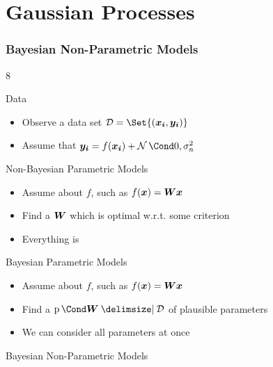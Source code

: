 \section{Gaussian Processes}
\begin{frame}[label=gp_non_parametric_models]
    \frametitle{Bayesian Non-Parametric Models}

    \begin{overlayarea}{\textwidth}{8\baselineskip}
         {
            \begin{block}{Data}
                \begin{itemize}
                    \item Observe a  data set $\D = \Set{\left( \mat{x_i}, \mat{y_i} \right)}$
                    \item Assume that $\mat{y_i} = f(\mat{x_i}) + \Gaussian{0, \sigma_n^2}$
                \end{itemize}
            \end{block}
        }
         {
            \begin{block}{Non-Bayesian Parametric Models}
                \begin{itemize}
                    \item Assume  about $f$, such as $f(\bm{x}) = \bm{W}\bm{x}$
                    \item Find a  $\bm{W}$ which is optimal w.r.t. some criterion
                    \item Everything is 
                \end{itemize}
            \end{block}
        }
         {
            \begin{block}{Bayesian Parametric Models}
                \begin{itemize}
                    \item Assume  about $f$, such as $f(\bm{x}) = \bm{W}\bm{x}$
                    \item Find a  $\Prob{\mat{W} \given \D}$ of plausible parameters
                    \item We can consider all parameters at once
                \end{itemize}
            \end{block}
        }
         {
            \begin{block}{Bayesian Non-Parametric Models}

\end{block}}
\end{overlayarea}
\end{frame}
